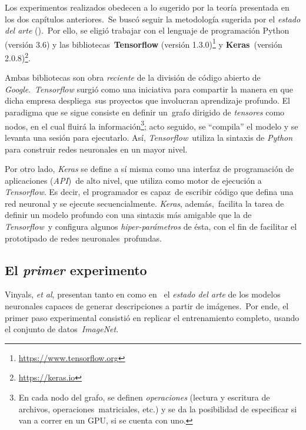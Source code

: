 \noindent
Los experimentos realizados obedecen a lo sugerido por la teoría presentada en los dos capítulos anteriores.\
Se buscó seguir la metodología sugerida por el \emph{estado del arte} (\cite{DBLP:journals/corr/VinyalsTBE16}).\
Por ello, se eligió trabajar con el lenguaje de programación Python (versión 3.6) y las bibliotecas\
\textbf{Tensorflow} (versión 1.3.0)\footnote{\url{https://www.tensorflow.org}} y \textbf{Keras}\
(versión 2.0.8)\footnote{\url{https://keras.io}}.\par
Ambas bibliotecas son obra \emph{reciente} de la división de código abierto de \emph{Google}.\
\emph{Tensorflow} surgió como una iniciativa para compartir la manera en que dicha empresa despliega\
sus proyectos que involucran aprendizaje profundo. El paradigma que se sigue consiste en definir un\
grafo dirigido de \emph{tensores} como nodos, en el cual fluirá la información\footnote{
  En cada nodo del grafo, se definen \emph{operaciones} (lectura y escritura de archivos, operaciones\
  matriciales, etc.) y se da la posibilidad de especificar si van a correr en un GPU, si se cuenta con uno.
}; acto seguido, se ``compila'' el modelo y se levanta una sesión para ejecutarlo. Así, \emph{Tensorflow}\
utiliza la sintaxis de \emph{Python} para construir redes neuronales en un mayor nivel.\par
Por otro lado, \emph{Keras} se define a sí misma como una interfaz de programación de aplicaciones (\emph{API})\
de alto nivel, que utiliza como motor de ejecución a \emph{Tensorflow}. Es decir, el programador es capaz\
de escribir código que defina una red neuronal y se ejecute secuencialmente. \emph{Keras}, además,\
facilita la tarea de definir un modelo profundo con una sintaxis más amigable que la de \emph{Tensorflow}\
y configura algunos \emph{hiper-parámetros} de ésta, con el fin de facilitar el prototipado de redes neuronales\
profundas.

\subsection{El \emph{primer} experimento}

\noindent
Vinyals, \emph{et al}, presentan tanto en \cite{DBLP:journals/corr/VinyalsTBE14} como en \cite{DBLP:journals/corr/VinyalsTBE16}\
el \emph{estado del arte} de los modelos neuronales capaces de generar descripciones a partir de imágenes.\
Por ende, el primer paso experimental consistió en replicar el entrenamiento completo, usando el conjunto de datos\
\emph{ImageNet}.


